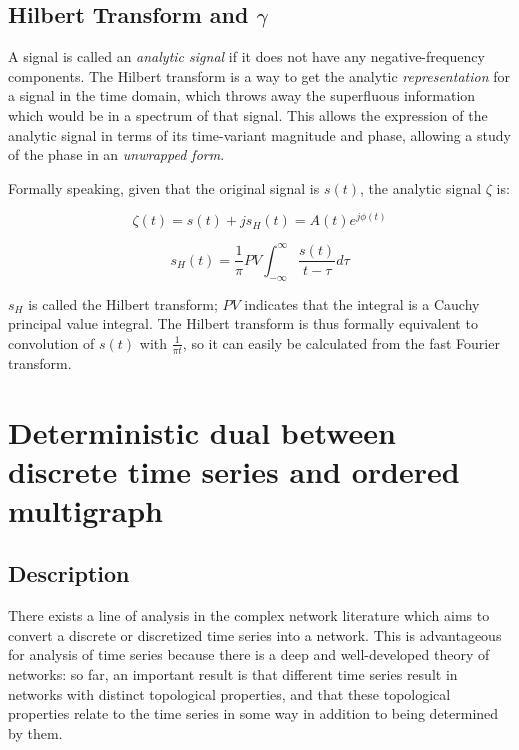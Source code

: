 \documentclass[12pt]{article}
\begin{document}


\subsection{Hilbert Transform and $\gamma$}

A signal is called an \emph{analytic signal} if it does not have any negative-frequency components. The Hilbert transform is a way to get the analytic \emph{representation} for a signal in the time domain, which throws away the superfluous information which would be in a spectrum of that signal. This allows the expression of the analytic signal in terms of its time-variant magnitude and phase, allowing a study of the phase in an \emph{unwrapped form}. %

Formally speaking, given that the original signal is $s(t)$, the analytic signal $\zeta$ is:

$$\zeta(t) = s(t) + js_H(t) = A(t)e^{j\phi(t)}$$

$$s_H(t) = \frac{1}{\pi} PV \int_{-\infty}^{\infty} \frac{s(t)}{t - \tau} d\tau$$

$s_H$ is called the Hilbert transform; $PV$ indicates that the integral is a Cauchy principal value integral. The Hilbert transform is thus formally equivalent to convolution of $s(t)$ with $\frac{1}{\pi t}$, so it can easily be calculated from the fast Fourier transform.






\section{Deterministic dual between discrete time series and ordered multigraph}

\subsection{Description}

There exists a line of analysis in the complex network literature which aims to convert a discrete or discretized time series into a network. This is advantageous for analysis of time series because there is a deep and well-developed theory of networks: so far, an important result is that different time series result in networks with distinct topological properties, and that these topological properties relate to the time series in some way in addition to being determined by them. %
\end{document}
